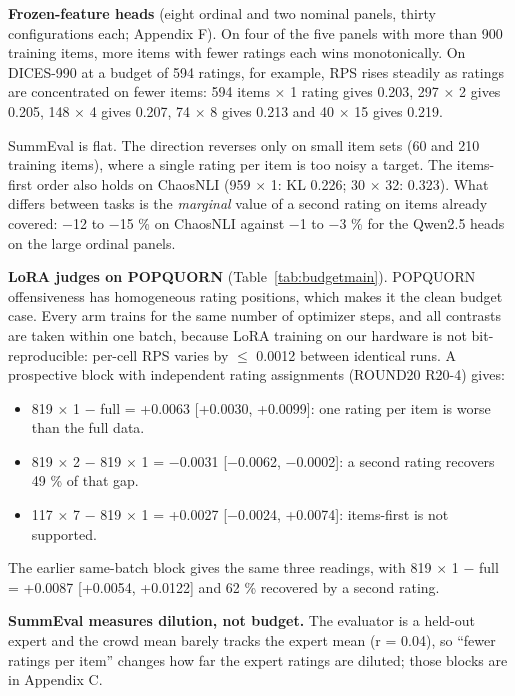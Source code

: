 \documentclass[10pt,twocolumn]{article}
\providecommand{\tightlist}{\setlength{\itemsep}{0pt}\setlength{\parskip}{0pt}}
\begin{document}
\textbf{Frozen-feature heads} (eight ordinal and two nominal panels, thirty configurations each; Appendix F). On four of the five panels with more than 900 training items, more items with fewer ratings each wins monotonically. On DICES-990 at a budget of 594 ratings, for example, RPS rises steadily as ratings are concentrated on fewer items: 594 items $\times$ 1 rating gives 0.203, 297 $\times$ 2 gives 0.205, 148 $\times$ 4 gives 0.207, 74 $\times$ 8 gives 0.213 and 40 $\times$ 15 gives 0.219.

SummEval is flat. The direction reverses only on small item sets (60 and 210 training items), where a single rating per item is too noisy a target. The items-first order also holds on ChaosNLI (959 $\times$ 1: KL 0.226; 30 $\times$ 32: 0.323). What differs between tasks is the \emph{marginal} value of a second rating on items already covered: $-$12 to $-$15 \% on ChaosNLI against $-$1 to $-$3 \% for the Qwen2.5 heads on the large ordinal panels.

\textbf{LoRA judges on POPQUORN} (Table~\ref{tab:budgetmain}). POPQUORN offensiveness has homogeneous rating positions, which makes it the clean budget case. Every arm trains for the same number of optimizer steps, and all contrasts are taken within one batch, because LoRA training on our hardware is not bit-reproducible: per-cell RPS varies by $\leq$ 0.0012 between identical runs. A prospective block with independent rating assignments (ROUND20 R20-4) gives:

\begin{itemize}
\tightlist
\item
  819 $\times$ 1 $-$ full = +0.0063 {[}+0.0030, +0.0099{]}: one rating per item is worse than the full data.
\item
  819 $\times$ 2 $-$ 819 $\times$ 1 = $-$0.0031 {[}$-$0.0062, $-$0.0002{]}: a second rating recovers 49 \% of that gap.
\item
  117 $\times$ 7 $-$ 819 $\times$ 1 = +0.0027 {[}$-$0.0024, +0.0074{]}: items-first is not supported.
\end{itemize}

The earlier same-batch block gives the same three readings, with 819 $\times$ 1 $-$ full = +0.0087 {[}+0.0054, +0.0122{]} and 62 \% recovered by a second rating.

\textbf{SummEval measures dilution, not budget.} The evaluator is a held-out expert and the crowd mean barely tracks the expert mean (r = 0.04), so ``fewer ratings per item'' changes how far the expert ratings are diluted; those blocks are in Appendix C.
\end{document}
